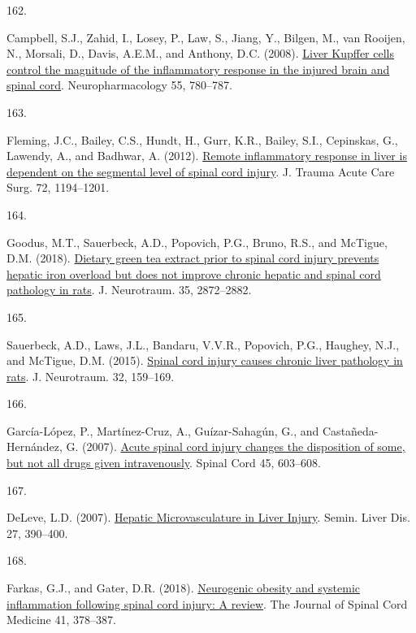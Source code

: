 \documentclass[
]{article}
\newlength{\cslhangindent}
\newlength{\csllabelwidth}
\newlength{\cslentryspacingunit} %
\newenvironment{CSLReferences}[2] %
 {%
  \setlength{\parindent}{0pt}
  \ifodd #1
  \let\oldpar\par
  \def\par{\hangindent=\cslhangindent\oldpar}
  \fi
  \setlength{\parskip}{#2\cslentryspacingunit}
 }%
 {}
\newcommand{\CSLLeftMargin}[1]{\parbox[t]{\csllabelwidth}{#1}}
\newcommand{\CSLRightInline}[1]{\parbox[t]{\linewidth - \csllabelwidth}{#1}\break}
\begin{document}
\begin{CSLReferences}{0}{0}
\leavevmode{}%
\CSLLeftMargin{162. }
\CSLRightInline{Campbell, S.J., Zahid, I., Losey, P., Law, S., Jiang, Y., Bilgen, M., van Rooijen, N., Morsali, D., Davis, A.E.M., and Anthony, D.C. (2008). \href{https://doi.org/10.1016/j.neuropharm.2008.06.074}{Liver {Kupffer} cells control the magnitude of the inflammatory response in the injured brain and spinal cord}. Neuropharmacology 55, 780--787.}

\leavevmode{}%
\CSLLeftMargin{163. }
\CSLRightInline{Fleming, J.C., Bailey, C.S., Hundt, H., Gurr, K.R., Bailey, S.I., Cepinskas, G., Lawendy, A., and Badhwar, A. (2012). \href{https://doi.org/10.1097/ta.0b013e31824d68bd}{Remote inflammatory response in liver is dependent on the segmental level of spinal cord injury}. J. Trauma Acute Care Surg. 72, 1194--1201.}

\leavevmode{}%
\CSLLeftMargin{164. }
\CSLRightInline{Goodus, M.T., Sauerbeck, A.D., Popovich, P.G., Bruno, R.S., and McTigue, D.M. (2018). \href{https://doi.org/10.1089/neu.2018.5771}{Dietary green tea extract prior to spinal cord injury prevents hepatic iron overload but does not improve chronic hepatic and spinal cord pathology in rats}. J. Neurotraum. 35, 2872--2882.}

\leavevmode{}%
\CSLLeftMargin{165. }
\CSLRightInline{Sauerbeck, A.D., Laws, J.L., Bandaru, V.V.R., Popovich, P.G., Haughey, N.J., and McTigue, D.M. (2015). \href{https://doi.org/10.1089/neu.2014.3497}{Spinal cord injury causes chronic liver pathology in rats}. J. Neurotraum. 32, 159--169.}

\leavevmode{}%
\CSLLeftMargin{166. }
\CSLRightInline{García-López, P., Martínez-Cruz, A., Guízar-Sahagún, G., and Castañeda-Hernández, G. (2007). \href{https://doi.org/10.1038/sj.sc.3102001}{Acute spinal cord injury changes the disposition of some, but not all drugs given intravenously}. Spinal Cord 45, 603--608.}

\leavevmode{}%
\CSLLeftMargin{167. }
\CSLRightInline{DeLeve, L.D. (2007). \href{https://doi.org/10.1055/s-2007-991515}{Hepatic {Microvasculature} in {Liver Injury}}. Semin. Liver Dis. 27, 390--400.}

\leavevmode{}%
\CSLLeftMargin{168. }
\CSLRightInline{Farkas, G.J., and Gater, D.R. (2018). \href{https://doi.org/10.1080/10790268.2017.1357104}{Neurogenic obesity and systemic inflammation following spinal cord injury: {A} review}. The Journal of Spinal Cord Medicine 41, 378--387.}


\end{CSLReferences}
\end{document}

